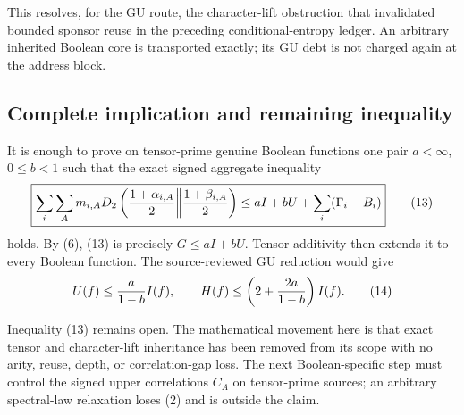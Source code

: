 This resolves, for the GU route, the character-lift obstruction that
invalidated bounded sponsor reuse in the preceding conditional-entropy
ledger.  An arbitrary inherited Boolean core is transported exactly; its
GU debt is not charged again at the address block.

\subsection*{Complete implication and remaining inequality}

It is enough to prove on tensor-prime genuine Boolean functions one pair
$a<\infty$, $0\le b<1$ such that the exact signed aggregate inequality
\[
 \boxed{
 \sum_i\sum_A m_{i,A}
 D_2\left({1+\alpha_{i,A}\over2}\middle\|
           {1+\beta_{i,A}\over2}\right)
 \le aI+bU+\sum_i(\Gamma_i-B_i)}                     \tag{13}
\]
holds.  By (6), (13) is precisely $G\le aI+bU$.  Tensor additivity then
extends it to every Boolean function.  The source-reviewed GU reduction
would give
\[
 U(f)\le {a\over1-b}I(f),\qquad
 H(f)\le\left(2+{2a\over1-b}\right)I(f).             \tag{14}
\]

Inequality (13) remains open.  The mathematical movement here is that
exact tensor and character-lift inheritance has been removed from its
scope with no arity, reuse, depth, or correlation-gap loss.  The next
Boolean-specific step must control the signed upper correlations $C_A$ on
tensor-prime sources; an arbitrary spectral-law relaxation loses (2) and
is outside the claim.

